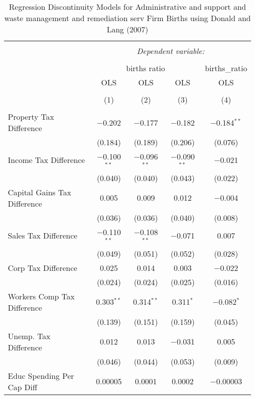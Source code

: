 
\begin{table}[!htbp] \centering 
  \caption{Regression Discontinuity Models for  Administrative and support and waste management and remediation serv Firm Births using Donald and Lang (2007)} 
  \label{} 
\begin{tabular}{@{\extracolsep{5pt}}lcccc} 
\\[-1.8ex]\hline 
\hline \\[-1.8ex] 
 & \multicolumn{4}{c}{\textit{Dependent variable:}} \\ 
\cline{2-5} 
\\[-1.8ex] & \multicolumn{3}{c}{births ratio} & births\_ratio \\ 
 & OLS & OLS & OLS & OLS \\ 
\\[-1.8ex] & (1) & (2) & (3) & (4)\\ 
\hline \\[-1.8ex] 
 Property Tax Difference & $-$0.202 & $-$0.177 & $-$0.182 & $-$0.184$^{**}$ \\ 
  & (0.184) & (0.189) & (0.206) & (0.076) \\ 
  Income Tax Difference & $-$0.100$^{**}$ & $-$0.096$^{**}$ & $-$0.090$^{**}$ & $-$0.021 \\ 
  & (0.040) & (0.040) & (0.043) & (0.022) \\ 
  Capital Gains Tax Difference & 0.005 & 0.009 & 0.012 & $-$0.004 \\ 
  & (0.036) & (0.036) & (0.040) & (0.008) \\ 
  Sales Tax Difference & $-$0.110$^{**}$ & $-$0.108$^{**}$ & $-$0.071 & 0.007 \\ 
  & (0.049) & (0.051) & (0.052) & (0.028) \\ 
  Corp Tax Difference & 0.025 & 0.014 & 0.003 & $-$0.022 \\ 
  & (0.024) & (0.024) & (0.025) & (0.016) \\ 
  Workers Comp Tax Difference & 0.303$^{**}$ & 0.314$^{**}$ & 0.311$^{*}$ & $-$0.082$^{*}$ \\ 
  & (0.139) & (0.151) & (0.159) & (0.045) \\ 
  Unemp. Tax Difference & 0.012 & 0.013 & $-$0.031 & 0.005 \\ 
  & (0.046) & (0.044) & (0.053) & (0.009) \\ 
  Educ Spending Per Cap Diff & 0.00005 & 0.0001 & 0.0002 & $-$0.00003 \\ 

\end{tabular}
\end{table}

